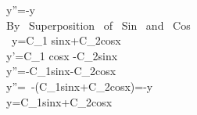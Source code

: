 y''=-y\\
By \ Superposition \ of \ Sin \ and \ Cos \\
\because \ y=C_1 sinx+C_2cosx\\
\hspace*{1cm} y'=C_1 cosx -C_2sinx\\
\hspace*{1cm} y''=-C_1sinx-C_2cosx\\
\therefore y''=\ -(C_1sinx+C_2cosx)=-y\\
y=C_1sinx+C_2cosx